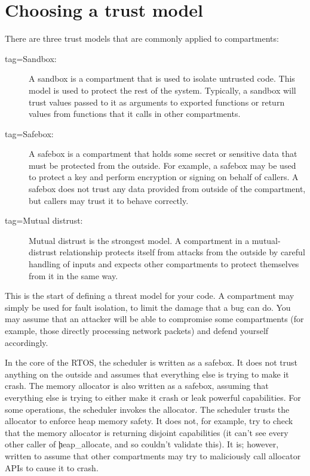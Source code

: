 \section{Choosing a trust model}

There are three trust models that are commonly applied to compartments:

\begin{description}
	\item[tag=Sandbox:]{ A sandbox is a compartment that is used to isolate
		untrusted code.
		This model is used to protect the rest of the system.
		Typically, a sandbox will trust values passed to it as arguments to exported functions or return values from functions that it calls in other compartments.}
		\item[tag=Safebox:]{ A safebox is a compartment that holds some secret or sensitive data that must be protected from the outside.
		For example, a safebox may be used to protect a key and perform encryption or signing on behalf of callers.
		A safebox does not trust any data provided from outside of the compartment, but callers may trust it to behave correctly.}
	\item[tag=Mutual distrust:]{ Mutual distrust is the strongest model.
		A compartment in a mutual-distrust relationship protects itself from attacks from the outside by careful handling of inputs and expects other compartments to protect themselves from it in the same way.}
\end{description}

This is the start of defining a threat model for your code.
A compartment may simply be used for fault isolation, to limit the damage that a bug can do.
You may assume that an attacker will be able to compromise some compartments (for example, those directly processing network packets) and defend yourself accordingly.

In the core of the RTOS, the scheduler is written as a safebox.
It does not trust anything on the outside and assumes that everything else is trying to make it crash.
The memory allocator is also written as a safebox, assuming that everything else is trying to either make it crash or leak powerful capabilities.
For some operations, the scheduler invokes the allocator.
The scheduler trusts the allocator to enforce heap memory safety.
It does not, for example, try to check that the memory allocator is returning disjoint capabilities (it can't see every other caller of \c{heap_allocate}, and so couldn't validate this).
It is; however, written to assume that other compartments may try to maliciously call allocator APIs to cause it to crash.

